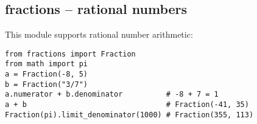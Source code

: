 \subsection{fractions -- rational numbers}
This module supports rational number arithmetic:
\begin{verbatim}
from fractions import Fraction
from math import pi
a = Fraction(-8, 5)
b = Fraction("3/7")
a.numerator + b.denominator          # -8 + 7 = 1
a + b                                # Fraction(-41, 35)
Fraction(pi).limit_denominator(1000) # Fraction(355, 113)
\end{verbatim}
